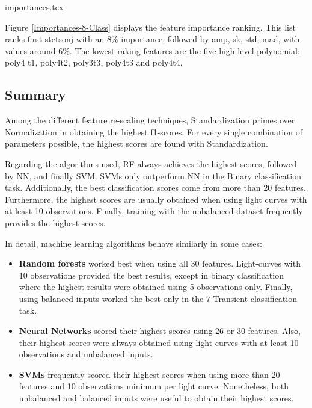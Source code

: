 \documentclass[a4paper,fleqn,usenatbib]{mnras}
\begin{document}
{importances.tex}

Figure \ref{Importances-8-Class} displays the feature importance ranking.
This list ranks first stetson\textunderscore j with an 8\% importance,
followed by amp, sk, std, mad, with values around 6\%. 
The lowest raking features are the five high level polynomial: poly4\textunderscore
t1,  poly4\textunderscore t2, poly3\textunderscore t3,
poly4\textunderscore t3 and poly4\textunderscore t4. 


\subsection{Summary}

Among the different feature re-scaling techniques, Standardization
primes over Normalization in obtaining the highest f1-scores. 
For every single combination of parameters possible, the highest
scores are found with Standardization. 

Regarding the algorithms used, RF always achieves the highest scores,
followed by NN,  and finally SVM. 
SVMs only outperform NN  in the Binary classification task. 
Additionally,  the best classification scores come from more than 20
features. 
Furthermore, the highest scores are usually obtained when using light
curves with at least 10 observations. 
Finally, training with the unbalanced dataset frequently provides the
highest scores.  

In detail, machine learning algorithms behave similarly in some
cases: 

\begin{itemize}
    \item \textbf{Random forests} worked best when using all 30
      features. Light-curves with 10 observations provided the best
      results, except in binary classification where the highest
      results were obtained using 5 observations only. Finally, using
      balanced inputs worked the best only in the 7-Transient
      classification task.  
    \item \textbf{Neural Networks} scored their highest scores using
      26 or 30 features. Also, their highest scores were always
      obtained using light curves with at least 10 observations and
      unbalanced inputs. 
    \item \textbf{SVMs} frequently scored their highest scores when
      using more than 20 features and 10 observations minimum per
      light curve. Nonetheless, both unbalanced and balanced inputs
      were useful to obtain their highest scores. 
\end{itemize}
\end{document}
